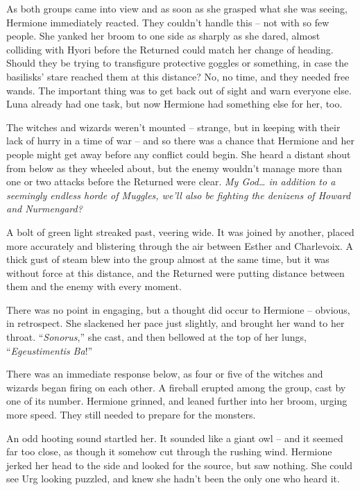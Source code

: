 As both groups came into view and as soon as she grasped what she was
seeing, Hermione immediately reacted. They couldn't handle this -- not
with so few people. She yanked her broom to one side as sharply as she
dared, almost colliding with Hyori before the Returned could match her
change of heading. Should they be trying to transfigure protective
goggles or something, in case the basilisks' stare reached them at this
distance? No, no time, and they needed free wands. The important thing
was to get back out of sight and warn everyone else. Luna already had
one task, but now Hermione had something else for her, too.

The witches and wizards weren't mounted -- strange, but in keeping with
their lack of hurry in a time of war -- and so there was a chance that
Hermione and her people might get away before any conflict could begin.
She heard a distant shout from below as they wheeled about, but the
enemy wouldn't manage more than one or two attacks before the Returned
were clear. \emph{My God\ldots{} in addition to a seemingly endless
horde of Muggles, we'll also be fighting the denizens of Howard and
Nurmengard?}

A bolt of green light streaked past, veering wide. It was joined by
another, placed more accurately and blistering through the air between
Esther and Charlevoix. A thick gust of steam blew into the group almost
at the same time, but it was without force at this distance, and the
Returned were putting distance between them and the enemy with every
moment.

There was no point in engaging, but a thought did occur to Hermione --
obvious, in retrospect. She slackened her pace just slightly, and
brought her wand to her throat. ``\emph{Sonorus},'' she cast, and then
bellowed at the top of her lungs, ``\emph{Egeustimentis Ba}!''

There was an immediate response below, as four or five of the witches
and wizards began firing on each other. A fireball erupted among the
group, cast by one of its number. Hermione grinned, and leaned further
into her broom, urging more speed. They still needed to prepare for the
monsters.

An odd hooting sound startled her. It sounded like a giant owl -- and it
seemed far too close, as though it somehow cut through the rushing wind.
Hermione jerked her head to the side and looked for the source, but saw
nothing. She could see Urg looking puzzled, and knew she hadn't been the
only one who heard it.

